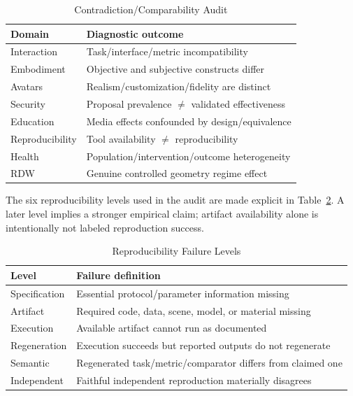 \begin{table}[H]
\caption{Contradiction/Comparability Audit}
\label{tab:contradictions}
\centering
\scriptsize
\begin{tabular}{p{}p{}}
\toprule
Domain & Diagnostic outcome\\
\midrule
Interaction & Task/interface/metric incompatibility\\
Embodiment & Objective and subjective constructs differ\\
Avatars & Realism/customization/fidelity are distinct\\
Security & Proposal prevalence $\neq$ validated effectiveness\\
Education & Media effects confounded by design/equivalence\\
Reproducibility & Tool availability $\neq$ reproducibility\\
Health & Population/intervention/outcome heterogeneity\\
RDW & Genuine controlled geometry regime effect\\
\bottomrule
\end{tabular}
\end{table}

The six reproducibility levels used in the audit are made explicit in Table~\ref{tab:repro}. A later level implies a stronger empirical claim; artifact availability alone is intentionally not labeled reproduction success.

\begin{table}[H]
\caption{Reproducibility Failure Levels}
\label{tab:repro}
\centering
\scriptsize
\begin{tabular}{lp{}}
\toprule
Level & Failure definition\\
\midrule
Specification & Essential protocol/parameter information missing\\
Artifact & Required code, data, scene, model, or material missing\\
Execution & Available artifact cannot run as documented\\
Regeneration & Execution succeeds but reported outputs do not regenerate\\
Semantic & Regenerated task/metric/comparator differs from claimed one\\
Independent & Faithful independent reproduction materially disagrees\\
\bottomrule
\end{tabular}
\end{table}

